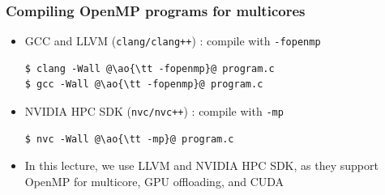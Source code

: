 \documentclass[12pt,dvipdfmx]{beamer}
\newcommand{\sectionompdeterminenumthreads}{{\href{https://www.openmp.org/spec-html/5.0/openmpsu35.html\#x55-880002.6.1}{2.6.1}}}
\newcommand{\ao}[1]{{\color{blue}#1}}
\begin{document}

\begin{frame}[fragile]
\frametitle{Compiling OpenMP programs for multicores}
\begin{itemize}
\item GCC and LLVM ({\tt clang/clang++}) : compile with {\tt -fopenmp}
\begin{lstlisting}
$ clang -Wall @\ao{\tt -fopenmp}@ program.c
$ gcc -Wall @\ao{\tt -fopenmp}@ program.c
\end{lstlisting}

\item NVIDIA HPC SDK ({\tt nvc/nvc++}) : compile with {\tt -mp}
\begin{lstlisting}
$ nvc -Wall @\ao{\tt -mp}@ program.c
\end{lstlisting}
\item In this lecture, we use LLVM and NVIDIA HPC SDK,
  as they support OpenMP for multicore, GPU offloading,
  and CUDA
\end{itemize}
\end{frame}
\end{document}
